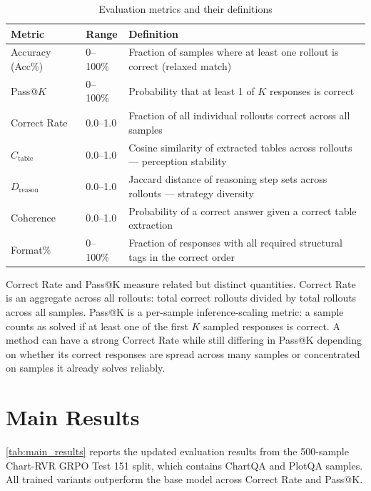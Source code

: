 \documentclass{iutbscthesis}
\begin{document}
\begin{table}[H]
    \centering
    \begin{tabular}{lp{1.8cm}p{7cm}}
        \toprule
        Metric & Range & Definition \\
        \midrule
        Accuracy (Acc\%) & 0--100\% & Fraction of samples where at least one rollout is correct (relaxed match) \\
        Pass@$K$ & 0--100\% & Probability that at least 1 of $K$ responses is correct \cite{chen2021evaluating} \\
        Correct Rate & 0.0--1.0 & Fraction of all individual rollouts correct across all samples \\
        $C_{\text{table}}$ & 0.0--1.0 & Cosine similarity of extracted tables across rollouts --- perception stability \\
        $D_{\text{reason}}$ & 0.0--1.0 & Jaccard distance of reasoning step sets across rollouts --- strategy diversity \\
        Coherence & 0.0--1.0 & Probability of a correct answer given a correct table extraction \\
        Format\% & 0--100\% & Fraction of responses with all required structural tags in the correct order \\
        \bottomrule
    \end{tabular}
    \caption{Evaluation metrics and their definitions}
    \label{tab:metrics}
\end{table}

Correct Rate and Pass@K measure related but distinct quantities. Correct Rate is an aggregate across all rollouts: total correct rollouts divided by total rollouts across all samples. Pass@K is a per-sample inference-scaling metric: a sample counts as solved if at least one of the first $K$ sampled responses is correct. A method can have a strong Correct Rate while still differing in Pass@K depending on whether its correct responses are spread across many samples or concentrated on samples it already solves reliably.

\section{Main Results}

\autoref{tab:main_results} reports the updated evaluation results from the 500-sample Chart-RVR GRPO Test 151 split, which contains ChartQA and PlotQA samples. All trained variants outperform the base model across Correct Rate and Pass@K.
\end{document}
